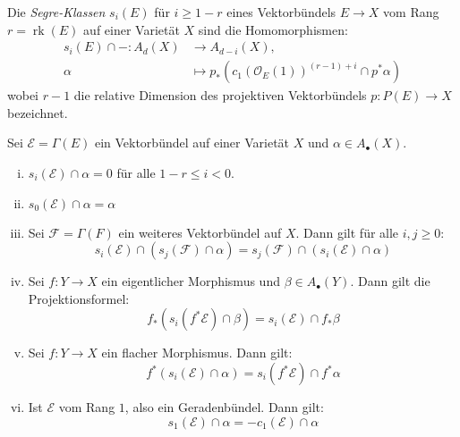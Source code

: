 \documentclass[10pt,a4paper]{article}
\begin{document}
\begin{definition}
Die \textit{Segre-Klassen} $s_i(E)$ für $i\geq 1-r$ eines Vektorbündels $E\to X$ vom Rang $r = \operatorname{rk}(E)$ auf einer Varietät $X$ sind die Homomorphismen:
\begin{align*}
s_i(E)\cap -: A_d(X)&\to A_{d-i}(X),\\ 
\alpha&\mapsto p_\ast(c_1(\mathcal{O}_E(1))^{(r-1)+i} \cap p^\ast\alpha)
\end{align*}
wobei $r-1$ die relative Dimension des projektiven Vektorbündels $p: P(E)\to X$ bezeichnet.
\end{definition}

\begin{proposition}
Sei $\mathcal{E} = \Gamma(E)$ ein Vektorbündel auf einer Varietät $X$ und $\alpha\in A_\bullet(X)$.
\begin{enumerate}[(i)]
\item $s_i(\mathcal{E})\cap\alpha = 0$ für alle $1-r\leq i <0$.
\item $s_0(\mathcal{E})\cap\alpha = \alpha$
\item Sei $\mathcal{F} = \Gamma(F)$ ein weiteres Vektorbündel auf $X$. Dann gilt für alle $i,j\geq 0$:
\[ s_i(\mathcal{E})\cap (s_j(\mathcal{F}) \cap \alpha) = s_j(\mathcal{F}) \cap (s_i(\mathcal{E})\cap \alpha) \]
\item Sei $f:Y\to X$ ein eigentlicher Morphismus und $\beta\in A_\bullet(Y)$. Dann gilt die Projektionsformel:
\[ f_\ast(s_i(f^\ast\mathcal{E})\cap\beta) = s_i(\mathcal{E})\cap f_\ast\beta \]
\item Sei $f:Y\to X$ ein flacher Morphismus. Dann gilt:
\[ f^\ast(s_i(\mathcal{E})\cap \alpha) = s_i(f^\ast\mathcal{E})\cap f^\ast\alpha \]
\item Ist $\mathcal{E}$ vom Rang $1$, also ein Geradenbündel. Dann gilt:
\[ s_1(\mathcal{E}) \cap\alpha = -c_1(\mathcal{E})\cap \alpha \]
\end{enumerate}
\end{proposition}
\end{document}
